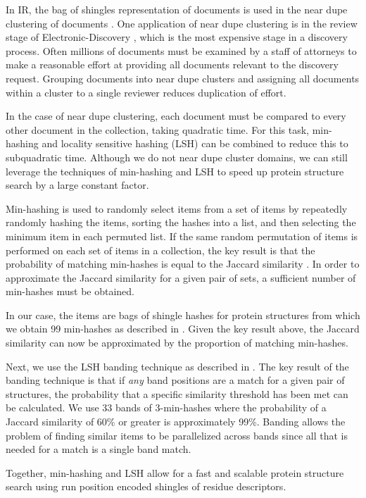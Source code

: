\documentclass[a4,center,fleqn]{NAR}
\begin{document}
In IR, the bag of shingles representation of documents is used in the near dupe clustering of documents \cite{Broder1997b}.
One application of near dupe clustering is in the review stage of Electronic-Discovery \cite{Joshi2008}, which is the most expensive stage in a discovery process. 
Often millions of documents must be examined by a staff of attorneys to make a reasonable effort at providing all documents relevant to the discovery request. 
Grouping documents into near dupe clusters and assigning all documents within a cluster to a single reviewer reduces duplication of effort. 

In the case of near dupe clustering, each document must be compared to every other document in the collection, taking quadratic time.
For this task, min-hashing \cite{Broder1998} and locality sensitive hashing (LSH) \cite{Indyk1998} can be combined to reduce this to subquadratic time. 
Although we do not near dupe cluster domains, we can still leverage the techniques of min-hashing and LSH to speed up protein structure search by a large constant factor.

Min-hashing is used to randomly select items from a set of items by repeatedly randomly hashing the items, sorting the hashes into a list, and then selecting the minimum item in each permuted list.
If the same random permutation of items is performed on each set of items in a collection, the key result is that the probability of matching min-hashes is equal to the Jaccard similarity \cite{Broder1998}.
In order to approximate the Jaccard similarity for a given pair of sets, a sufficient number of min-hashes must be obtained. 

In our case, the items are bags of shingle hashes for protein structures from which we obtain 99 min-hashes as described in \cite{Rajaraman2012}. 
Given the key result above, the Jaccard similarity can now be approximated by the proportion of matching min-hashes. 

Next, we use the LSH banding technique as described in \cite{Rajaraman2012}.
The key result of the banding technique is that if \emph{any} band positions are a match for a given pair of structures, the probability that a specific similarity threshold has been met can be calculated. 
We use 33 bands of 3-min-hashes where the probability of a Jaccard similarity of 60\% or greater is approximately 99\%. 
Banding allows the problem of finding similar items to be parallelized across bands since all that is needed for a match is a single band match. 

Together, min-hashing and LSH allow for a fast and scalable protein structure search using run position encoded shingles of residue descriptors.  
\end{document}
